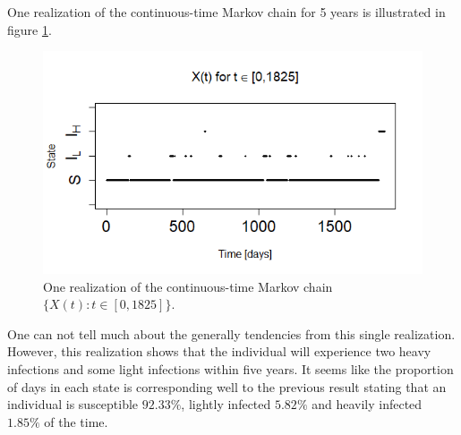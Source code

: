 One realization of the continuous-time Markov chain for 5 years is illustrated in figure \ref{1realiz5yr}.
\begin{figure}
    \centering
    \includegraphics[width=130mm]{1real5yr.png}
    \caption{One realization of the continuous-time Markov chain $\{X(t):t \in [0, 1825]\}$.}
    \label{1realiz5yr}
\end{figure}
One can not tell much about the generally tendencies from this single realization. However, this realization shows that the individual will experience two heavy infections and some light infections within five years. It seems like the proportion of days in each state is corresponding well to the previous result stating that an individual is susceptible $92.33\%$, lightly infected $5.82\%$ and heavily infected $1.85\%$ of the time. 


